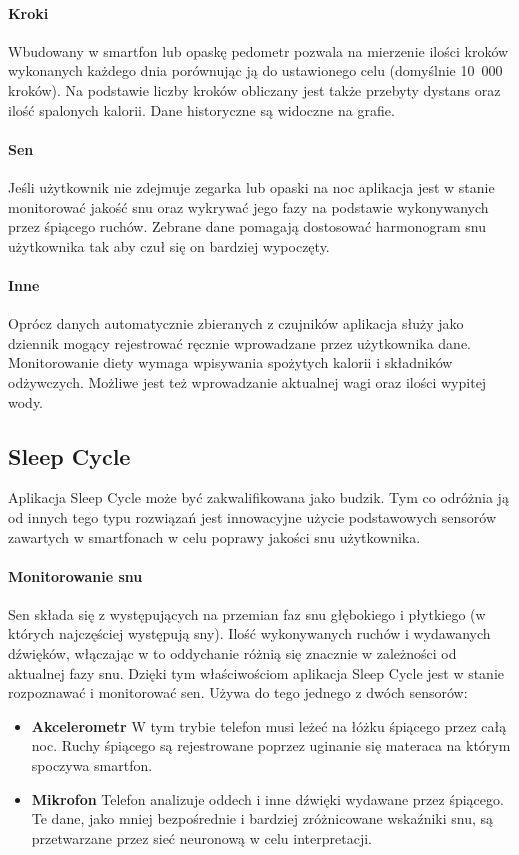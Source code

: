 \paragraph{Kroki} Wbudowany w smartfon lub opaskę pedometr pozwala na mierzenie ilości kroków wykonanych każdego dnia porównując ją do ustawionego celu (domyślnie 10~000 kroków). Na podstawie liczby kroków obliczany jest także przebyty dystans oraz ilość spalonych kalorii. Dane historyczne są widoczne na grafie.

\paragraph{Sen} Jeśli użytkownik nie zdejmuje zegarka lub opaski na noc aplikacja jest w stanie monitorować jakość snu oraz wykrywać jego fazy na podstawie wykonywanych przez śpiącego ruchów. Zebrane dane pomagają dostosować harmonogram snu użytkownika tak aby czuł się on bardziej wypoczęty.

\paragraph{Inne} Oprócz danych automatycznie zbieranych z czujników aplikacja służy jako dziennik mogący rejestrować ręcznie wprowadzane przez użytkownika dane. Monitorowanie diety wymaga wpisywania spożytych kalorii i składników odżywczych. Możliwe jest też wprowadzanie aktualnej wagi oraz ilości wypitej wody. 

\subsection{Sleep Cycle}
Aplikacja Sleep Cycle może być zakwalifikowana jako budzik. Tym co odróżnia ją od innych tego typu rozwiązań jest innowacyjne użycie podstawowych sensorów zawartych w smartfonach w celu poprawy jakości snu użytkownika. 

\paragraph{Monitorowanie snu}
Sen składa się z występujących na przemian faz snu głębokiego i płytkiego (w których najczęściej występują sny). Ilość wykonywanych ruchów i wydawanych dźwięków, włączając w to oddychanie różnią się znacznie w zależności od aktualnej fazy snu. Dzięki tym właściwościom aplikacja Sleep Cycle jest w stanie rozpoznawać i monitorować sen. Używa do tego jednego z dwóch sensorów:

\begin{itemize}
	\item {\bf Akcelerometr} W tym trybie telefon musi leżeć na łóżku śpiącego przez całą noc. Ruchy śpiącego są rejestrowane poprzez uginanie się materaca na którym spoczywa smartfon. 
	\item {\bf Mikrofon} Telefon analizuje oddech i inne dźwięki wydawane przez śpiącego. Te dane, jako mniej bezpośrednie i bardziej zróżnicowane wskaźniki snu, są przetwarzane przez sieć neuronową w celu interpretacji.
\end{itemize}


